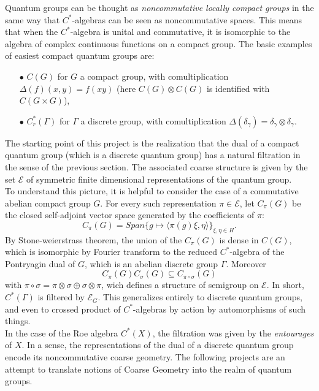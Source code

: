 Quantum groups can be thought as \textit{noncommutative locally compact groups} in the same way that $C^*$-algebras can be seen as noncommutative spaces. This means that when the $C^*$-algebra is unital and commutative, it is isomorphic to the algebra of complex continuous functions on a compact group. The basic examples of easiest compact quantum groups are:
\begin{itemize}
\item[$\bullet$] $C(G)$ for $G$ a compact group, with comultiplication $\Delta(f)(x,y)= f(xy)$ (here $C(G)\otimes C(G)$ is identified with $C(G\times G)$),
\item[$\bullet$] $C^*_r(\Gamma)$ for $\Gamma$ a discrete group, with comultiplication $\Delta(\delta_\gamma)= \delta_\gamma \otimes \delta_\gamma$.\\
\end{itemize}     
The starting point of this project is the realization that the dual of a compact quantum group (which is a discrete quantum group) has a natural filtration in the sense of the previous section. The associated coarse structure is given by the set $\mathcal E$ of symmetric finite dimensional representations of the quantum group. \\

To understand this picture, it is helpful to consider the case of a commutative abelian compact group $G$. For every such representation $\pi\in \mathcal E$, let $C_\pi(G)$ be the closed self-adjoint vector space generated by the coefficients of $\pi$:
\[C_\pi(G)  = Span \{ g \mapsto \langle \pi(g)\xi, \eta\rangle\}_{\xi,\eta\in H}.\]
By Stone-weierstrass theorem, the union of the $C_\pi(G)$ is dense in $C(G)$, which is isomorphic by Fourier transform to the reduced $C^*$-algebra of the Pontryagin dual of $G$, which is an abelian discrete group $\Gamma$. Moreover
\[C_\pi(G)C_\sigma(G) \subseteq C_{\pi \circ\sigma}(G)\]
with $\pi \circ\sigma = \pi \otimes\sigma \oplus \sigma \otimes \pi$, wich defines a structure of semigroup on $\mathcal E$. In short, $C^*(\Gamma)$ is filtered by 
$\mathcal E_G$. This generalizes entirely to discrete quantum groups, and even to crossed product of $C^*$-algebras by action by automorphisms of such things. \\

In the case of the Roe algebra $C^*(X)$, the filtration was given by the \textit{entourages} of $X$. In a sense, the representations of the dual of a discrete quantum group encode its noncommutative coarse geometry. The following projects are an attempt to translate notions of Coarse Geometry into the realm of quantum groups. \\

